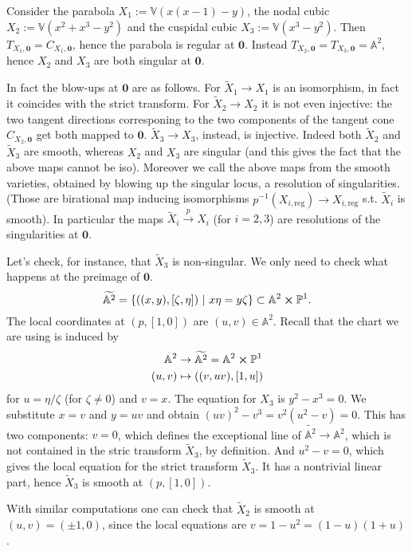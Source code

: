 \begin{ex}
	Consider the parabola $X_1 := \mathbb{V}\left( x (x-1) - y \right)$,
	the nodal cubic $X_2 := \mathbb{V}\left( x^2 + x^3 - y^2 \right)$
	and the cuspidal cubic $X_3 := \mathbb{V}\left( x^3 - y^2 \right)$.
	Then $T_{X_1, \mathbf{0}} = C_{X_1, \mathbf{0}}$, hence the parabola is regular at $\mathbf{0}$.
	Instead $T_{X_2, \mathbf{0}} = T_{X_3, \mathbf{0}} = \mathbb{A}^{2}$, 
	hence $X_2$ and $X_3$ are both singular at $\mathbf{0}$.

	In fact the blow-ups at $\mathbf{0}$ are as follows.
	For $\widetilde{X}_1 \to X_1$ is an isomorphism, in fact it coincides with the strict transform.
	For $\widetilde{X}_2 \to X_2$ it is not even injective: the two tangent directions corresponing
	to the two components of the tangent cone $C_{X_2, \mathbf{0}}$ get both mapped to $\mathbf{0}$.
	$\widetilde{X}_3 \to X_3$, instead, is injective.
	Indeed both $\widetilde{X}_2$ and $\widetilde{X}_3$ are smooth, whereas $X_2$ and $X_3$ are singular
	(and this gives the fact that the above maps cannot be iso).
	Moreover we call the above maps from the smooth varieties, obtained by
	blowing up the singular locus, a resolution of singularities.
	(Those are birational map inducing isomorphisms $p^{-1} \left( X_{i, \text{reg}} \right) \to X_{i, \text{reg}}$
	s.t. $\widetilde{X}_i$ is smooth).
	In particular the maps $\widetilde{X}_i \xrightarrow{p} X_i$ (for $i = 2,3$)
	are resolutions of the singularities at $\mathbf{0}$.

	Let's check, for instance, that $\widetilde{X}_3$ is non-singular.
	We only need to check what happens at the preimage of $\mathbf{0}$.
	\begin{equation}
		\widetilde{\mathbb{A}^{2}} = \left\{ \left((x,y), [\zeta,\eta]\right) \ \middle|\ 
		x \eta = y \zeta\right\} \subset \mathbb{A}^{2} \cross \mathbb{P}^{1}
	.\end{equation} 
	The local coordinates at $\left( p, [1,0] \right)$ are $(u,v) \in \mathbb{A}^{2}$.
	Recall that the chart we are using is induced by
	\begin{align}
		\mathbb{A}^{2} &\to \widetilde{\mathbb{A}^{2}} = \mathbb{A}^{2} \cross \mathbb{P}^{1} \\
		\left(u, v\right) &\mapsto \left((v, uv), [1, u] \right)
	\end{align} 
	for $u = \eta/\zeta$ (for $\zeta \neq 0$) and $v = x$.
	The equation for $X_3$ is $y^2 - x^3 = 0$.
	We substitute $x = v$ and $y = uv$ and obtain $(uv)^2 - v^3 = v^2 \left( u^2 - v \right) = 0$.
	This has two components:
	$v = 0$, which defines the exceptional line of $\widetilde{\mathbb{A}^{2}} \to \mathbb{A}^{2}$,
	which is not contained in the stric transform $\widetilde{X}_3$, by definition.
	And $u^2 - v = 0$, which gives the local equation for the strict transform $\widetilde{X}_3$.
	It has a nontrivial linear part, hence $\widetilde{X}_3$ is smooth at $\left(p, [1,0]\right)$.

	With similar computations one can check that $\widetilde{X}_2$ is smooth
	at $(u,v) = (\pm1, 0)$, since the local equations are $v = 1 - u^2 = (1-u)(1+u)$.
\end{ex} 

